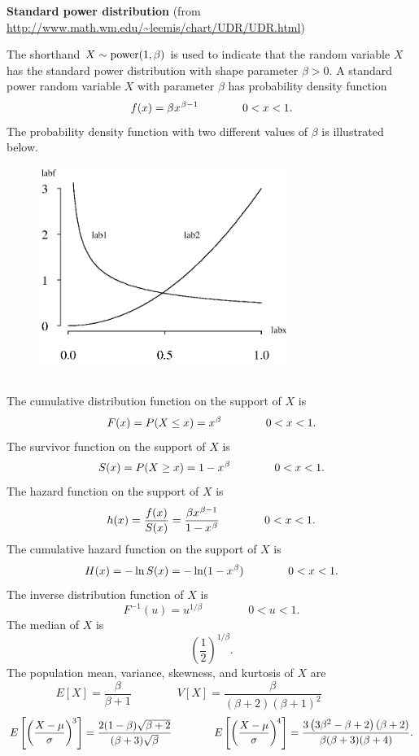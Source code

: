 \documentclass[12pt,fullpage]{article}
\begin{document}
\noindent
{\bf Standard power distribution}  (from \color{blue}\url{http://www.math.wm.edu/~leemis/chart/UDR/UDR.html}\color{black})

\noindent
The shorthand $X \sim {\rm power}(1,\beta)$ is used to indicate that the
random variable $X$ has the standard power distribution with shape parameter $\beta > 0$.
A standard power random variable $X$ with parameter $\beta$ has probability density function 
$$
f(x) = \beta \kern 0.04em x ^ {\kern 0.04em\beta - 1} \qquad \qquad 0 < x < 1.
$$
The probability density function with two different values of $\beta$ is illustrated below.
{\begin{figure}[h!]
\begin{center}
\includegraphics[width=3.2in]{StandardpowerPlot.ps}
\end{center}
\end{figure}}\\
The cumulative distribution function on
the support of $X$ is
$$
F(x) = P(X \le x) = x ^ {\kern 0.04em\beta}  \qquad \qquad 0 <  x < 1.
$$
The survivor function on the support of $X$ is
$$
S(x) = P(X \ge x) = 1-x^{\kern 0.04em\beta} \qquad \qquad 0  < x < 1.
$$
The hazard function on the support of $X$ is
$$
h(x) = \frac{f(x)}{S(x)} = \frac{\beta x^{\kern 0.04em\beta-1}}{1-x^{\kern 0.04em \beta}} \qquad \qquad 0 < x < 1.
$$
The cumulative hazard function on the support of $X$ is
$$
H(x) = - \ln S(x) = - \ln(1 - x ^ {\kern 0.04em \beta}) \qquad \qquad 0 < x < 1.
$$
The inverse distribution function of $X$ is
$$
F ^ {-1}(u) = u ^ {1 / \beta} \qquad \qquad 0 < u < 1.
$$
The median of $X$ is
$$
\left(\frac{1}{2}\right) ^ {1 / \beta}.
$$
The population mean, variance, skewness, and kurtosis of $X$ are
$$
E[X] = \frac{\beta}{\beta + 1} \qquad \qquad 
V[X] = \frac{\beta}{(\beta+2)(\beta + 1)^2} \qquad \qquad 
$$
$$
E\left[ \left( \frac{X - \mu}{\sigma} \right) ^ {\kern -0.08em 3} \right]  = \frac{2 (1 - \beta) \sqrt{\beta + 2}}{(\beta + 3)\sqrt{\beta}} \qquad \qquad 
E\left[ \left( \frac{X - \mu}{\sigma} \right) ^ {\kern -0.08em 4} \right] = \frac{3 \left(3 \beta ^ 2 - \beta + 2\right)\left(\beta + 2\right)}{\beta(\beta + 3)(\beta + 4)}.
$$ \\
\end{document}

